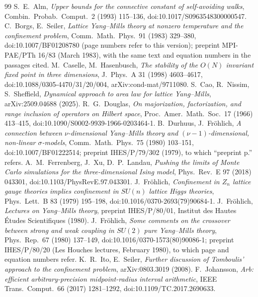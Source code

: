 \documentclass[11pt,a4paper]{article}
\theoremstyle{plain}
\theoremstyle{remark}
\numberwithin{equation}{section}
\begin{document}
\begin{thebibliography}{99}
 S.~E.~Alm, \emph{Upper bounds for the connective constant of self-avoiding walks}, Combin.\ Probab.\ Comput.\ 2
(1993) 115--136, doi:10.1017/S0963548300000547.
 C.~Borgs, E.~Seiler, \emph{Lattice Yang--Mills theory at nonzero temperature and the confinement problem}, Comm.\
Math.\ Phys.\ 91 (1983) 329--380, doi:10.1007/BF01208780 (page numbers refer to this version); preprint MPI-PAE/PTh 16/83 (March
1983), with the same text and equation numbers in the passages cited.
\bibitem{CH98} M.~Caselle, M.~Hasenbusch, \emph{The stability of the $O(N)$ invariant fixed point in three dimensions}, J.\ Phys.\ A
31 (1998) 4603--4617, doi:10.1088/0305-4470/31/20/004, arXiv:cond-mat/9711080.
\bibitem{CNS25} S.~Cao, R.~Nissim, S.~Sheffield, \emph{Dynamical approach to area law for lattice Yang--Mills}, arXiv:2509.04688
(2025).
 R.~G.~Douglas, \emph{On majorization, factorization, and range inclusion of operators on Hilbert space}, Proc.\ Amer.\
Math.\ Soc.\ 17 (1966) 413--415, doi:10.1090/S0002-9939-1966-0203464-1.
\bibitem{DF80} B.~Durhuus, J.~Fr\"ohlich, \emph{A connection between $\nu$-dimensional Yang--Mills theory and $(\nu-1)$-dimensional,
non-linear $\sigma$-models}, Comm.\ Math.\ Phys.\ 75 (1980) 103--151, doi:10.1007/BF01222514; preprint IHES/P/79/302 (1979), to which
``preprint p.'' refers.
\bibitem{FXL18} A.~M.~Ferrenberg, J.~Xu, D.~P.~Landau, \emph{Pushing the limits of Monte Carlo simulations for the three-dimensional
Ising model}, Phys.\ Rev.\ E 97 (2018) 043301, doi:10.1103/PhysRevE.97.043301.
\bibitem{Fro79} J.~Fr\"ohlich, \emph{Confinement in $Z_n$ lattice gauge theories implies confinement in $SU(n)$ lattice Higgs
theories}, Phys.\ Lett.\ B 83 (1979) 195--198, doi:10.1016/0370-2693(79)90684-1.
\bibitem{Fro80a} J.~Fr\"ohlich, \emph{Lectures on Yang--Mills theory}, preprint IHES/P/80/01, Institut des Hautes \'Etudes
Scientifiques (1980).
\bibitem{Fro80b} J.~Fr\"ohlich, \emph{Some comments on the crossover between strong and weak coupling in $SU(2)$ pure Yang--Mills
theory}, Phys.\ Rep.\ 67 (1980) 137--149, doi:10.1016/0370-1573(80)90086-1; preprint IHES/P/80/20 (Les Houches lectures, February
1980), to which page and equation numbers refer.
\bibitem{IS08} K.~R.~Ito, E.~Seiler, \emph{Further discussion of Tomboulis' approach to the confinement problem}, arXiv:0803.3019
(2008).
\bibitem{Joh17} F.~Johansson, \emph{Arb: efficient arbitrary-precision midpoint-radius interval arithmetic}, IEEE Trans.\ Comput.\ 66
(2017) 1281--1292, doi:10.1109/TC.2017.2690633.

\end{thebibliography}
\end{document}
